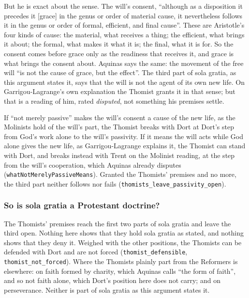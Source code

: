 \documentclass[11pt]{article}
\begin{document}
But he is exact about the sense. The will’s consent, “although as a disposition it precedes it [grace] in the genus or order of material cause, it nevertheless follows it in the genus or order of formal, efficient, and final cause”. These are Aristotle’s four kinds of cause: the material, what receives a thing; the efficient, what brings it about; the formal, what makes it what it is; the final, what it is for. So the consent comes before grace only as the readiness that receives it, and grace is what brings the consent about. Aquinas says the same: the movement of the free will “is not the cause of grace, but the effect”. The third part of sola gratia, as this argument states it, says that the will is not the agent of its own new life. On Garrigou-Lagrange’s own explanation the Thomist grants it in that sense; but that is a reading of him, rated \emph{disputed}, not something his premises settle.

If “not merely passive” makes the will’s consent a cause of the new life, as the Molinists hold of the will’s part, the Thomist breaks with Dort at Dort’s step from God’s work alone to the will’s passivity. If it means the will acts while God alone gives the new life, as Garrigou-Lagrange explains it, the Thomist can stand with Dort, and breaks instead with Trent on the Molinist reading, at the step from the will’s cooperation, which Aquinas already disputes (\texttt{what\allowbreak{}Not\allowbreak{}Merely\allowbreak{}Passive\allowbreak{}Means}). Granted the Thomists’ premises and no more, the third part neither follows nor fails (\texttt{thomists\_\allowbreak{}leave\_\allowbreak{}passivity\_\allowbreak{}open}).

\subsubsection*{So is sola gratia a Protestant doctrine?}
The Thomists’ premises reach the first two parts of sola gratia and leave the third open. Nothing here shows that they hold sola gratia as stated, and nothing shows that they deny it. Weighed with the other positions, the Thomists can be defended with Dort and are not forced (\texttt{thomist\_\allowbreak{}defensible}, \texttt{thomist\_\allowbreak{}not\_\allowbreak{}forced}). Where the Thomists plainly part from the Reformers is elsewhere: on faith formed by charity, which Aquinas calls “the form of faith”, and so not faith alone, which Dort’s position here does not carry; and on perseverance. Neither is part of sola gratia as this argument states it.
\end{document}
